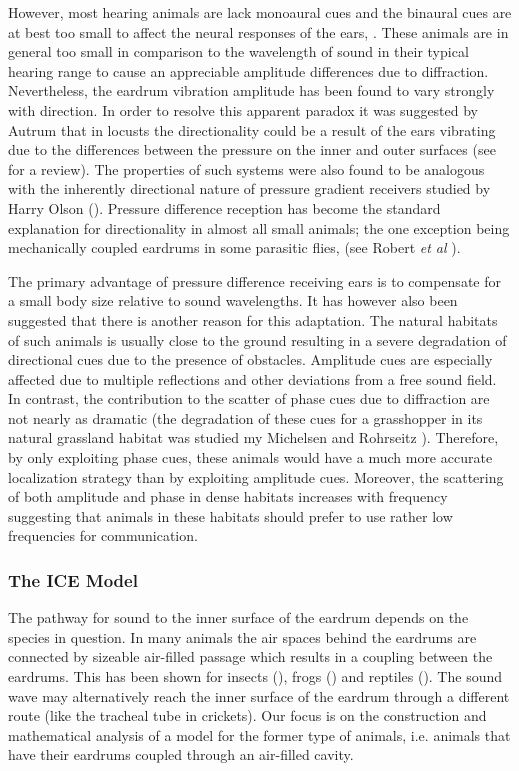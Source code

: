 \documentclass[12pt]{book}
\begin{document}
However, most hearing animals are lack monoaural cues and the binaural
cues are at best too small to affect the neural responses of the ears, \cite{michelsen1}. These animals are in general too small in comparison
to the wavelength of sound in their typical hearing range to cause an appreciable amplitude differences due to diffraction. Nevertheless, 
the eardrum vibration amplitude has been found to vary strongly with direction. In order to resolve this apparent paradox it was
suggested by Autrum \cite{autrumjcomphys} that in locusts the directionality could be a result of the ears vibrating due to the
differences between the pressure on the inner and outer surfaces (see \cite{michelsenlarsen} for a review).  The properties of such systems were also found to be analogous with the inherently directional 
nature of pressure gradient receivers studied by Harry Olson (\cite{olsonmichrophones}). Pressure difference reception has
become the standard explanation for directionality in almost all small animals; the one exception being mechanically coupled
eardrums in some parasitic flies, (see Robert \emph{et al} \cite{roberthoy}).

The primary advantage of pressure difference receiving ears is to compensate for a small body size relative to sound wavelengths. It has
however also been suggested that there is another reason for this adaptation. The natural habitats of such animals
is usually close to the ground resulting in a severe degradation of directional cues due to the presence of obstacles. Amplitude cues are especially affected due to multiple reflections and other deviations
from a free sound field. In contrast, the contribution to the scatter of phase cues due to diffraction are not nearly as dramatic (the degradation
of these cues for a grasshopper in its natural grassland habitat was studied my Michelsen and Rohrseitz \cite{michelsenrohrseitz97}). Therefore,
 by only exploiting phase cues, these animals would have a much more accurate localization strategy than by exploiting amplitude cues. Moreover, 
 the scattering of both amplitude and phase in dense habitats increases with frequency suggesting that animals in these habitats should prefer to
 use rather low frequencies for communication. 

 \subsubsection{The ICE Model}
The pathway for sound to the inner surface of the eardrum depends on the species in question. In many animals the air spaces behind the eardrums are
connected by sizeable air-filled passage which results in a coupling between the eardrums. This has been shown for 
insects (\cite{michelsenbiophysics}), frogs (\cite{jorgensenanurans}) and reptiles (\cite{dalsgaardmanley1}). The sound wave
may alternatively reach the inner surface of the eardrum through a different route (like the tracheal tube in crickets). Our focus
is on the construction and mathematical analysis of a model for the former type of animals, i.e. animals that have their eardrums coupled through an air-filled cavity.
\end{document}
